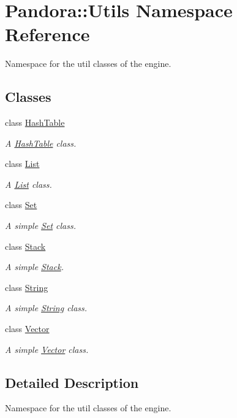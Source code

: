 \hypertarget{namespacePandora_1_1Utils}{
\section{Pandora::Utils Namespace Reference}
\label{namespacePandora_1_1Utils}
}


Namespace for the util classes of the engine.  
\subsection*{Classes}
\begin{DoxyCompactItemize}
\item 
class \hyperlink{classPandora_1_1Utils_1_1HashTable}{HashTable}
\begin{DoxyCompactList}\small\item\em A \hyperlink{classPandora_1_1Utils_1_1HashTable}{HashTable} class. \item\end{DoxyCompactList}\item 
class \hyperlink{classPandora_1_1Utils_1_1List}{List}
\begin{DoxyCompactList}\small\item\em A \hyperlink{classPandora_1_1Utils_1_1List}{List} class. \item\end{DoxyCompactList}\item 
class \hyperlink{classPandora_1_1Utils_1_1Set}{Set}
\begin{DoxyCompactList}\small\item\em A simple \hyperlink{classPandora_1_1Utils_1_1Set}{Set} class. \item\end{DoxyCompactList}\item 
class \hyperlink{classPandora_1_1Utils_1_1Stack}{Stack}
\begin{DoxyCompactList}\small\item\em A simple \hyperlink{classPandora_1_1Utils_1_1Stack}{Stack}. \item\end{DoxyCompactList}\item 
class \hyperlink{classPandora_1_1Utils_1_1String}{String}
\begin{DoxyCompactList}\small\item\em A simple \hyperlink{classPandora_1_1Utils_1_1String}{String} class. \item\end{DoxyCompactList}\item 
class \hyperlink{classPandora_1_1Utils_1_1Vector}{Vector}
\begin{DoxyCompactList}\small\item\em A simple \hyperlink{classPandora_1_1Utils_1_1Vector}{Vector} class. \item\end{DoxyCompactList}\end{DoxyCompactItemize}


\subsection{Detailed Description}
Namespace for the util classes of the engine. 